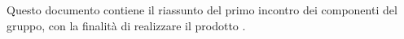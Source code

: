 Questo documento contiene il riassunto del primo incontro dei componenti del gruppo, con la finalità di realizzare il prodotto \progetto.

